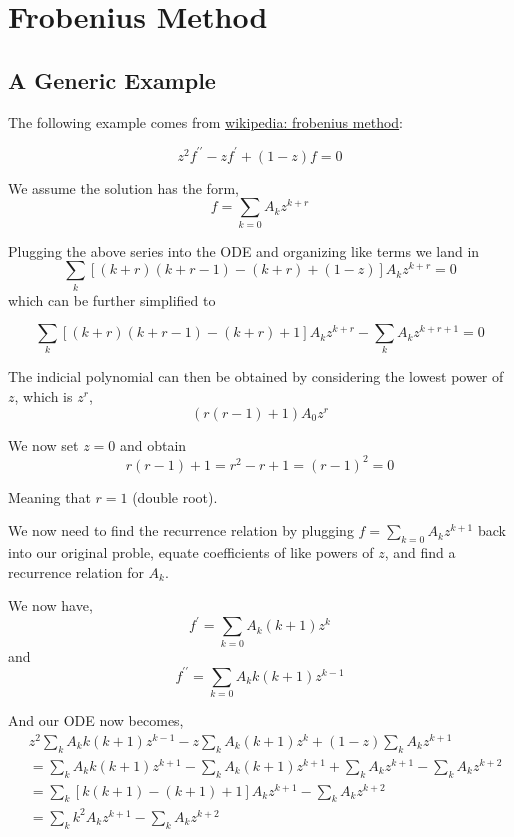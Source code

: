 \section{Frobenius Method}

\subsection{A Generic Example}

The following example comes from
\href{https://en.wikipedia.org/wiki/Frobenius_method}{wikipedia: frobenius method}:

$$
z^2 f^{\prime\prime} - zf^\prime + (1-z)f = 0
$$

We assume the solution has the form,
$$
f = \sum_{k=0} A_k z^{k+r}
$$

Plugging the above series into the ODE and organizing like terms we land in
$$
\sum_k \left[ (k+r)(k+r-1) - (k+r) + (1-z) \right] A_k z^{k+r} = 0
$$
which can be further simplified to

$$
\sum_k \left[ (k+r)(k+r-1) - (k+r) + 1 \right] A_k z^{k+r}
    - \sum_k A_k z^{k+r+1} 
= 0
$$

The indicial polynomial can then be obtained by considering the lowest power of $z$, which is $z^r$,
$$
(r(r-1) + 1) A_0 z^r
$$

We now set $z=0$ and obtain
$$
r(r-1) + 1 = r^2 -r + 1 = (r-1)^2 = 0
$$

Meaning that $r=1$ (double root).

We now need to find the recurrence relation by plugging $f = \sum_{k=0} A_k z^{k+1}$ back into our original proble,
equate coefficients of like powers of $z$, and find a recurrence relation for $A_k$.

We now have,
$$
f^\prime = \sum_{k=0} A_k (k+1) z^k
$$
and
$$
f^{\prime\prime} = \sum_{k=0} A_k k(k+1) z^{k-1}
$$

And our ODE now becomes,
\begin{align*}
& z^2 \sum_{k} A_k k(k+1) z^{k-1}
    - z \sum_{k} A_k (k+1) z^k
    + (1-z) \sum_{k} A_k z^{k+1} \\
&= \sum_{k} A_k k(k+1) z^{k+1}
    - \sum_{k} A_k (k+1) z^{k+1}
    + \sum_{k} A_k z^{k+1}
    - \sum_{k} A_k z^{k+2} \\
&= \sum_k \left[ k(k+1) - (k+1) + 1 \right] A_k z^{k+1} - \sum_{k} A_k z^{k+2} \\
&= \sum_k k^2 A_k z^{k+1} - \sum_{k} A_k z^{k+2}
\end{align*}

